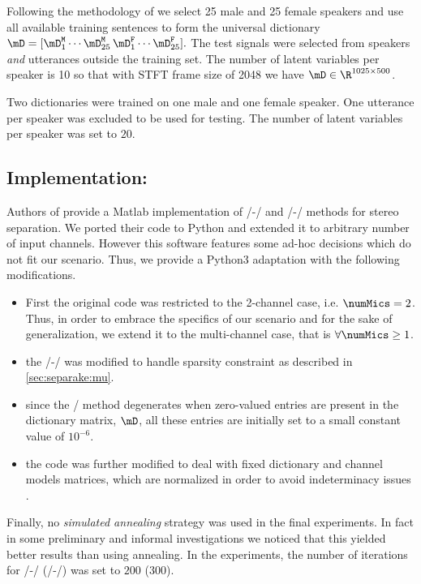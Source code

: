  Following the methodology of  we select 25 male and 25 female speakers
and use all available training sentences to form the universal dictionary
$
    \mD = [\mD_1^\mathtt{M}\cdots \mD_{25}^\mathtt{M}\,\mD_{1}^\mathtt{F}\cdots\mD_{25}^\mathtt{F}].
$
The test signals were selected from speakers \emph{and} utterances outside the training set.
The number of latent variables per speaker is 10 so that with STFT frame size of 2048 we have $\mD\in\R^{1025\times500}$.

Two dictionaries were trained on one male and one female speaker.
One utterance per speaker was excluded to be used for testing.
The number of latent variables per speaker was set to $20$.

\subsection{Implementation:}
Authors of  provide a Matlab implementation of \MU/-\NMF/ and \EM/-\NMF/ methods for stereo separation.
We ported their code to Python and extended it to arbitrary number of input channels.
However this software features some ad-hoc decisions which do not fit our scenario.
Thus, we provide a Python3 adaptation with the following modifications.
\begin{itemize}
    \item First the original code was restricted to the 2-channel case, i.e.  $\numMics = 2$.
    Thus, in order to embrace the specifics of our scenario and for the sake of generalization, we extend it to the multi-channel case, that is $\forall \numMics \geq 1$.
    \item the \MU/-\NMF/ was modified to handle sparsity constraint as described in \ref{sec:separake:mu}.
    \item since the \EM/ method degenerates when zero-valued entries are present in the dictionary matrix, $\mD$, all these entries are initially set to a small constant value of $10^{-6}$.
    \item the code was further modified to deal with fixed dictionary and channel models matrices, which are normalized in order to avoid indeterminacy issues .
\end{itemize}
Finally, no \textit{simulated annealing} strategy was used in the final experiments.
In fact in some preliminary and informal investigations we noticed that this yielded better results than using annealing.
In the experiments, the number of iterations for \MU/-\NMF/ (\EM/-\NMF/) was set to $200$ ($300$).

